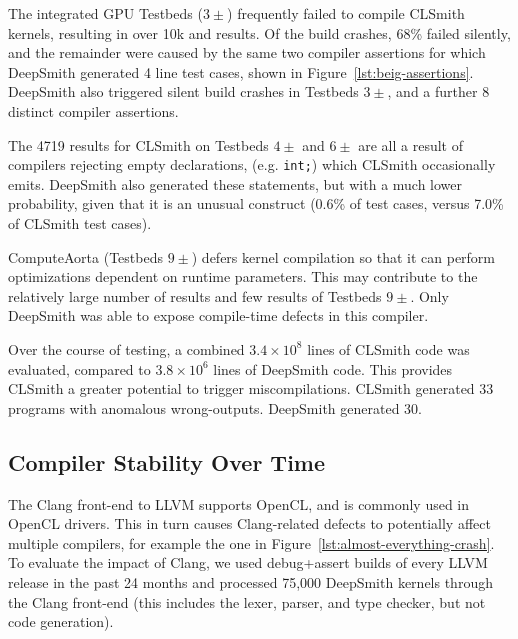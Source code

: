 The integrated GPU Testbeds ($3\pm$) frequently failed to compile CLSmith
kernels, resulting in over 10k \bc and \bto results. Of the build crashes, 68\%
failed silently, and the remainder were caused by the same two compiler
assertions for which DeepSmith generated 4 line test cases, shown in
Figure~\ref{lst:beig-assertions}. DeepSmith also triggered silent build crashes
in Testbeds $3\pm$, and a further 8 distinct compiler assertions.

The 4719 \abf results for CLSmith on Testbeds $4\pm$ and $6\pm$ are all a result
of compilers rejecting empty declarations, (e.g. \texttt{int;}) which CLSmith
occasionally emits. DeepSmith also generated these statements, but with a much
lower probability, given that it is an unusual construct (0.6\% of test cases,
versus 7.0\% of CLSmith test cases).

ComputeAorta (Testbeds $9\pm$) defers kernel compilation so that it can perform
optimizations dependent on runtime parameters. This may contribute to the
relatively large number of \arc results and few \bc results of Testbeds $9\pm$.
Only DeepSmith was able to expose compile-time defects in this compiler.

Over the course of testing, a combined $3.4 \times 10^8$ lines of CLSmith code
was evaluated, compared to $3.8 \times 10^6$ lines of DeepSmith code. This
provides CLSmith a greater potential to trigger miscompilations. CLSmith
generated 33 programs with anomalous wrong-outputs. DeepSmith generated 30.


\subsection{Compiler Stability Over Time}%
\label{subsec:clangs}

The Clang front-end to LLVM supports OpenCL, and is commonly used in OpenCL
drivers. This in turn causes Clang-related defects to potentially affect
multiple compilers, for example the one in
Figure~\ref{lst:almost-everything-crash}. To evaluate the impact of Clang, we
used debug+assert builds of every LLVM release in the past 24 months and
processed 75,000 DeepSmith kernels through the Clang front-end (this includes
the lexer, parser, and type checker, but not code generation).

